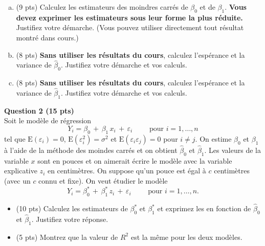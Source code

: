 \documentclass[letter, 11pt]{article}
\begin{document}
\begin{enumerate}[(a)]
\item  (9 pts) Calculez les estimateurs des moindres carrés de $\beta_0$ et de $\beta_1$. {\bf Vous devez exprimer les estimateurs sous leur forme la plus réduite.} Justifiez votre démarche. (Vous pouvez utiliser directement tout résultat montré dans cours.)
\item (8 pts) {\bf Sans utiliser les résultats du cours}, calculez l'espérance et la variance de $\hat\beta_0$. Justifiez votre démarche et vos calculs.
\item (8 pts)  {\bf Sans utiliser les résultats du cours}, calculez l'espérance et la variance de $\hat\beta_1$. Justifiez votre démarche et vos calculs.
\end{enumerate}

\newpage
\textbf{Question 2 (15 pts)} \\

Soit le modèle de régression
$$
Y_i = \beta_0\,+\,\beta_1\, x_i \,+\, \varepsilon_i\qquad \text{ pour } i=1,\ldots,n
$$
tel que  $\mathrm{E}\left(\varepsilon_i\right) = 0$, $\mathrm{E}\left(\varepsilon_i^2\right) = \sigma^2$ et $\mathrm{E}\left(\varepsilon_i \varepsilon_j \right) = 0$ pour $i\neq j$. On estime $\beta_0$ et $\beta_1$ à l'aide de la méthode des moindes carrés et on obtient $\widehat{\beta}_0$ et $\widehat{\beta}_1$. Les valeurs de la variable $x$ sont en pouces et on aimerait écrire le modèle avec la variable explicative $z_i$ en centimètres. On suppose qu'un pouce est égal à $c$ centimètres (avec un $c$ connu et fixe). On veut étudier le modèle
$$
Y_i = \beta_0^* \,+\,\beta_1^* \, z_i \,+\, \varepsilon_i\qquad \text{ pour } i=1,\ldots,n.
$$

\vspace{0.2 in}
\begin{itemize}
\item[(a)] (10 pts) Calculez les estimateurs de $\beta_0^*$ et $\beta_1^*$ et exprimez les en fonction de $\widehat{\beta}_0$ et $\widehat{\beta}_1$. Justifiez votre réponse.
\vspace{0.1 in}
\item[(b)] (5 pts) Montrez que la valeur de $R^2$ est la même pour les deux modèles.
\end{itemize}

\vspace{0.5cm}
\end{document}
